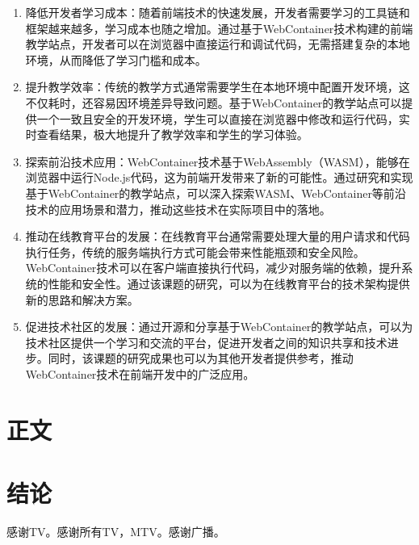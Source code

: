 \documentclass{HDU-Bachelor-Thesis}
\begin{document}
\begin{enumerate}

    \item 降低开发者学习成本：随着前端技术的快速发展，开发者需要学习的工具链和框架越来越多，学习成本也随之增加。通过基于WebContainer技术构建的前端教学站点，开发者可以在浏览器中直接运行和调试代码，无需搭建复杂的本地环境，从而降低了学习门槛和成本。

    \item 提升教学效率：传统的教学方式通常需要学生在本地环境中配置开发环境，这不仅耗时，还容易因环境差异导致问题。基于WebContainer的教学站点可以提供一个一致且安全的开发环境，学生可以直接在浏览器中修改和运行代码，实时查看结果，极大地提升了教学效率和学生的学习体验。

    \item 探索前沿技术应用：WebContainer技术基于WebAssembly（WASM），能够在浏览器中运行Node.js代码，这为前端开发带来了新的可能性。通过研究和实现基于WebContainer的教学站点，可以深入探索WASM、WebContainer等前沿技术的应用场景和潜力，推动这些技术在实际项目中的落地。

    \item 推动在线教育平台的发展：在线教育平台通常需要处理大量的用户请求和代码执行任务，传统的服务端执行方式可能会带来性能瓶颈和安全风险。WebContainer技术可以在客户端直接执行代码，减少对服务端的依赖，提升系统的性能和安全性。通过该课题的研究，可以为在线教育平台的技术架构提供新的思路和解决方案。

    \item 促进技术社区的发展：通过开源和分享基于WebContainer的教学站点，可以为技术社区提供一个学习和交流的平台，促进开发者之间的知识共享和技术进步。同时，该课题的研究成果也可以为其他开发者提供参考，推动WebContainer技术在前端开发中的广泛应用。
    

\end{enumerate}


\clearpage
\section{正文}



\clearpage
\section{结论}

\clearpage
{}

感谢TV。感谢所有TV，MTV。感谢广播。
\end{document}
